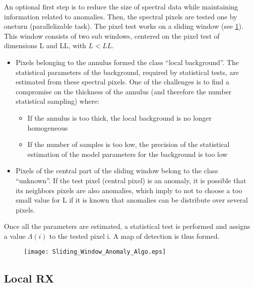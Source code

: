 An optional first step is to reduce the size of spectral data
while maintaining information related to anomalies. Then, the spectral pixels
are tested one by oneturn (parallelizable task). The pixel
test works on a sliding window (see \ref{fig:sliding_anomaly}). This
window consists of two sub windows, centered on the pixel test of  dimensions L and LL, with $L<LL$.

\begin{itemize}
\item Pixels belonging to the annulus formed the class ``local background''. The statistical parameters of the background,
  required by statistical tests, are estimated from these
  spectral pixels. One of the challenges is to find a
  compromise on the thickness of the annulus (and therefore the number
  statistical sampling) where:
 
\begin{itemize}
\item If the annulus is too thick, the local background  is no longer homogeneous
\item If the number of samples is too low, the precision of
  the statistical estimation of the model parameters for the background is too
  low
\end{itemize}  
\item Pixels of the central part of the sliding window
  belong to the class ``unknown''. If the test pixel (central pixel) is an anomaly, it is possible that its neighbors
  pixels are also anomalies, which imply to not to choose
  a too small value for L if it is known that anomalies
  can be distribute over several pixels.
\end{itemize}  
Once all the parameters are estimated, a statistical test is performed and assigns a
value $\Lambda(i)$ to the tested pixel i. A map of detection is thus
formed.

\begin{figure}[h]
  \centering
  \texttt{[image: Sliding\_Window\_Anomaly\_Algo.eps]}
  \label{fig:sliding_anomaly}
\end{figure}

\subsection{Local RX}
